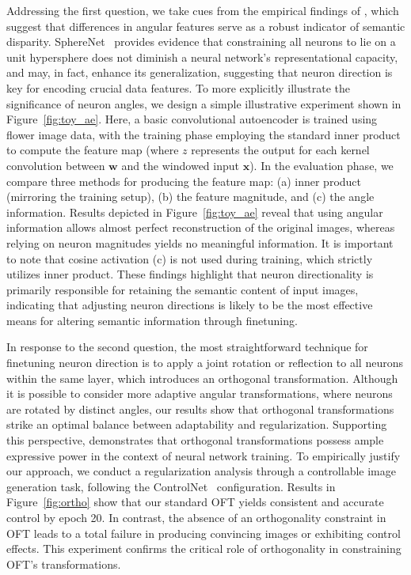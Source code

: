Addressing the first question, we take cues from the empirical findings of \cite{liu2018decoupled,chen2020angular}, which suggest that differences in angular features serve as a robust indicator of semantic disparity. SphereNet~\cite{liu2017deep} provides evidence that constraining all neurons to lie on a unit hypersphere does not diminish a neural network’s representational capacity, and may, in fact, enhance its generalization, suggesting that neuron direction is key for encoding crucial data features. To more explicitly illustrate the significance of neuron angles, we design a simple illustrative experiment shown in Figure~\ref{fig:toy_ae}. Here, a basic convolutional autoencoder is trained using flower image data, with the training phase employing the standard inner product to compute the feature map (where $z$ represents the output for each kernel convolution between $\bm{w}$ and the windowed input $\bm{x}$). In the evaluation phase, we compare three methods for producing the feature map: (a) inner product (mirroring the training setup), (b) the feature magnitude, and (c) the angle information. Results depicted in Figure~\ref{fig:toy_ae} reveal that using angular information allows almost perfect reconstruction of the original images, whereas relying on neuron magnitudes yields no meaningful information. It is important to note that cosine activation (c) is not used during training, which strictly utilizes inner product. These findings highlight that neuron directionality is primarily responsible for retaining the semantic content of input images, indicating that adjusting neuron directions is likely to be the most effective means for altering semantic information through finetuning.

In response to the second question, the most straightforward technique for finetuning neuron direction is to apply a joint rotation or reflection to all neurons within the same layer, which introduces an orthogonal transformation. Although it is possible to consider more adaptive angular transformations, where neurons are rotated by distinct angles, our results show that orthogonal transformations strike an optimal balance between adaptability and regularization. Supporting this perspective, \cite{liu2021orthogonal} demonstrates that orthogonal transformations possess ample expressive power in the context of neural network training. To empirically justify our approach, we conduct a regularization analysis through a controllable image generation task, following the ControlNet~\cite{zhang2023adding} configuration. Results in Figure~\ref{fig:ortho} show that our standard OFT yields consistent and accurate control by epoch 20. In contrast, the absence of an orthogonality constraint in OFT leads to a total failure in producing convincing images or exhibiting control effects. This experiment confirms the critical role of orthogonality in constraining OFT’s transformations.

